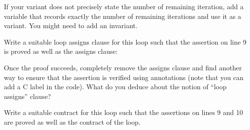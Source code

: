If your variant does not precisely state the number of remaining
iteration, add a variable that records exactly the number of remaining
iterations and use it as a variant. You might need to add an invariant.





Write a suitable loop assigns clause for this loop such that the assertion
on line 9 is proved as well as the assigns clause:






Once the proof succeeds, completely remove the assigns clause and find
another way to ensure that the assertion is verified using annotations (note
that you can add a C label in the code). What do you deduce about the notion
of ``loop assigns'' clause?





Write a suitable contract for this loop such that the assertions on lines
9 and 10 are proved as well as the contract of the loop.



